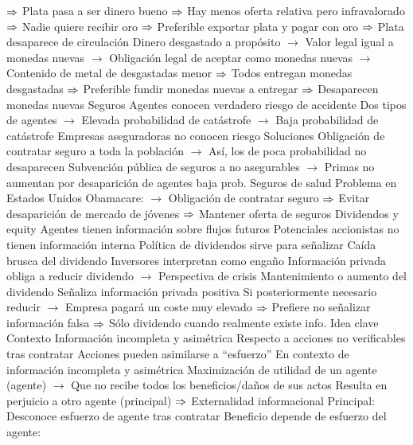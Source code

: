 \documentclass{nuevotema}
\begin{document}
\begin{esquemal}
				\4[] $\Rightarrow$ Plata pasa a ser dinero bueno
				\4[] $\Rightarrow$ Hay menos oferta relativa pero infravalorado
				\4[] $\Rightarrow$ Nadie quiere recibir oro
				\4[] $\Rightarrow$ Preferible exportar plata y pagar con oro
				\4[] $\Rightarrow$ Plata desaparece de circulación
				\4[] Dinero desgastado a propósito
				\4[] $\to$ Valor legal igual a monedas nuevas
				\4[] $\to$ Obligación legal de aceptar como monedas nuevas
				\4[] $\to$ Contenido de metal de desgastadas menor
				\4[] $\Rightarrow$ Todos entregan monedas desgastadas
				\4[] $\Rightarrow$ Preferible fundir monedas nuevas a entregar
				\4[] $\Rightarrow$ Desaparecen monedas nuevas
			\3 Seguros
				\4 Agentes conocen verdadero riesgo de accidente
				\4[] Dos tipos de agentes
				\4[] $\to$ Elevada probabilidad de catástrofe
				\4[] $\to$ Baja probabilidad de catástrofe
				\4 Empresas aseguradoras no conocen riesgo
				\4 Soluciones
				\4[] Obligación de contratar seguro a toda la población
				\4[] $\to$ Así, los de poca probabilidad no desaparecen
				\4[] Subvención pública de seguros a no asegurables
				\4[] $\to$ Primas no aumentan por desaparición de agentes baja prob.
				\4 Seguros de salud
				\4[] Problema en Estados Unidos
				\4[] Obamacare:
				\4[] $\to$ Obligación de contratar seguro
				\4[] $\Rightarrow$ Evitar desaparición de mercado de jóvenes
				\4[] $\Rightarrow$ Mantener oferta de seguros
			\3 Dividendos y equity
				\4 Agentes tienen información sobre flujos futuros
				\4 Potenciales accionistas no tienen información interna
				\4 Política de dividendos sirve para señalizar
				\4 Caída brusca del dividendo
				\4[] Inversores interpretan como engaño
				\4[] Información privada obliga a reducir dividendo
				\4[] $\to$ Perspectiva de crisis
				\4 Mantenimiento o aumento del dividendo
				\4[] Señaliza información privada positiva
				\4[] Si posteriormente necesario reducir
				\4[] $\to$ Empresa pagará un coste muy elevado
				\4[] $\Rightarrow$ Prefiere no señalizar información falsa
				\4[] $\Rightarrow$ Sólo dividendo cuando realmente existe info.
	\1 
		\2 Idea clave
			\3 Contexto
				\4 Información incompleta y asimétrica
				\4[] Respecto a acciones no verificables tras contratar
				\4[] Acciones pueden asimilarse a ``esfuerzo''
				\4 En contexto de información incompleta y asimétrica
				\4[] Maximización de utilidad de un agente (agente)
				\4[] $\to$ Que no recibe todos los beneficios/daños de sus actos
				\4[] Resulta en perjuicio a otro agente (principal)
				\4[] $\Rightarrow$ Externalidad informacional
				\4 Principal:
				\4[] Desconoce esfuerzo de agente tras contratar
				\4[] Beneficio depende de esfuerzo del agente:

\end{esquemal}
\end{document}

